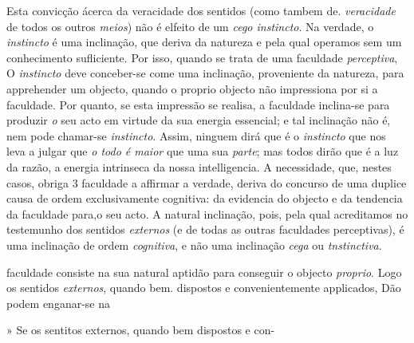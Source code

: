 Esta convicção ácerca da veracidade dos sentidos (como tambem de. \emph{veracidade} de todos os outros \emph{meios}) não é elfeito de um \emph{cego instincto}. Na verdade, o \emph{instincto} é uma inclinação, que deriva da natureza e pela qual operamos sem um conhecimento sufliciente. Por isso, quando se trata de uma faculdade \emph{perceptiva}, O \emph{instincto} deve conceber-se come uma inclinação, proveniente da natureza, para apprehender um objecto, quando o proprio objecto não impressiona por si a faculdade. Por quanto, se esta impressão se realisa, a faculdade inclina-se para produzir \emph{o} seu acto em virtude da sua energia essencial; e tal inclinação não é, nem pode chamar-se \emph{instincto}. Assim, ninguem dirá que é o \emph{instincto} que nos leva a julgar que \emph{o todo é maior} que uma sua \emph{parte}; mas todos dirão que é a luz da razão, a energia intrinseca da nossa intelligencia. A necessidade, que, nestes casos, obriga 3 faculdade a affirmar a verdade, deriva do concurso de uma duplice causa de ordem exclusivamente cognitiva: da evidencia do objecto e da tendencia da faculdade para,o seu acto. A natural inclinação, pois, pela qual acreditamos no testemunho dos sentidos \emph{externos} (e de todas as outras faculdades perceptivas), é uma inclinação de ordem \emph{cognitiva}, e não uma inclinação \emph{cega} ou \emph{tnstinctiva}.

faculdade consiste na sua natural aptidão para conseguir o objecto \emph{proprio}. Logo os sentidos \emph{externos}, quando bem. dispostos e convenientemente applicados, Dão podem enganar-se na

» Se os sentitos externos, quando bem dispostos e con-

